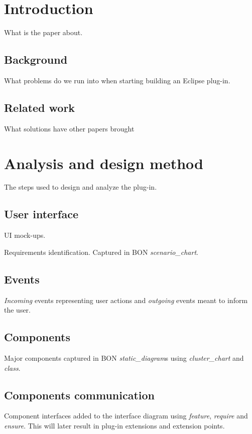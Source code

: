 \documentclass[conference]{IEEEtran}
\begin{document}
\section{Introduction}
What is the paper about.


%
\subsection{Background}
What problems do we run into when starting building an Eclipse plug-in.



%
\subsection{Related work}
What solutions have other papers brought


\section{Analysis and design method}
The steps used to design and analyze the plug-in.


%
\subsection{User interface}
UI mock-ups. 


Requirements identification. Captured in BON \emph{scenario\_chart}.

%
\subsection{Events}
\emph{Incoming} events representing user actions and \emph{outgoing} events meant to inform the user.


%
\subsection{Components}
Major components captured in BON \emph{static\_diagram}s using \emph{cluster\_chart} and \emph{class}.


%
\subsection{Components communication}
Component interfaces added to the interface diagram using  \emph{feature}, \emph{require} and \emph{ensure}. This will later result in plug-in extensions and extension points.
\end{document}
